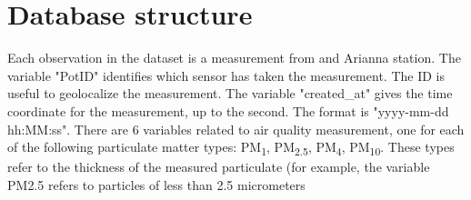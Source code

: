 \documentclass{article}
\begin{document}
\section{Database structure}

Each observation in the dataset is a measurement from and Arianna station. 
The variable "PotID" identifies which sensor has taken the measurement. The ID is useful to geolocalize the measurement.
The variable "created\_at" gives the time coordinate for the measurement, up to the second. The format is "yyyy-mm-dd hh:MM:ss".
There are 6 variables related to air quality measurement, one for each of the following particulate matter types: PM\textsubscript{1}, PM\textsubscript{2.5}, PM\textsubscript{4}, PM\textsubscript{10}. These types refer to the thickness of the measured particulate (for example, the variable PM{2.5} refers to particles of less than 2.5 micrometers
\end{document}
